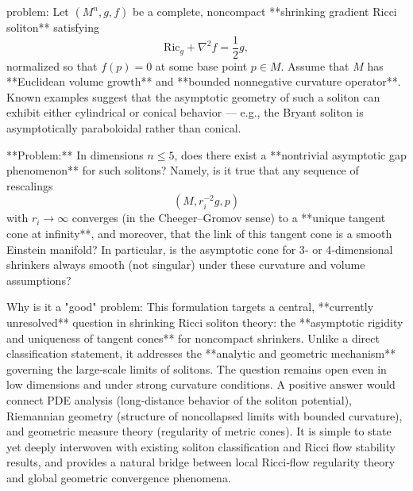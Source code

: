 problem:  
Let \((M^n, g, f)\) be a complete, noncompact **shrinking gradient Ricci soliton** satisfying  
\[
\mathrm{Ric}_g + \nabla^2 f = \frac{1}{2} g,
\]
normalized so that \(f(p)=0\) at some base point \(p\in M\).  
Assume that \(M\) has **Euclidean volume growth** and **bounded nonnegative curvature operator**.  
Known examples suggest that the asymptotic geometry of such a soliton can exhibit either cylindrical or conical behavior — e.g., the Bryant soliton is asymptotically paraboloidal rather than conical.  

**Problem:**  
In dimensions \(n \le 5\), does there exist a **nontrivial asymptotic gap phenomenon** for such solitons?  
Namely, is it true that any sequence of rescalings  
\[
(M, r_i^{-2}g, p)
\]
with \(r_i \to \infty\) converges (in the Cheeger–Gromov sense) to a **unique tangent cone at infinity**, and moreover, that the link of this tangent cone is a smooth Einstein manifold?  
In particular, is the asymptotic cone for 3‑ or 4‑dimensional shrinkers always smooth (not singular) under these curvature and volume assumptions?

Why is it a "good" problem:  
This formulation targets a central, **currently unresolved** question in shrinking Ricci soliton theory: the **asymptotic rigidity and uniqueness of tangent cones** for noncompact shrinkers.  
Unlike a direct classification statement, it addresses the **analytic and geometric mechanism** governing the large‑scale limits of solitons. The question remains open even in low dimensions and under strong curvature conditions.  
A positive answer would connect PDE analysis (long‑distance behavior of the soliton potential), Riemannian geometry (structure of noncollapsed limits with bounded curvature), and geometric measure theory (regularity of metric cones).  
It is simple to state yet deeply interwoven with existing soliton classification and Ricci flow stability results, and provides a natural bridge between local Ricci‑flow regularity theory and global geometric convergence phenomena.